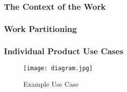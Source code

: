 \documentclass[12pt, titlepage]{article}
\begin{document}
    		\subsubsection{The Context of the Work}
    		\subsubsection{Work Partitioning}
    		\subsubsection{Individual Product Use Cases}
    		 
            \begin{figure}[H]
                \centering
                \texttt{[image: diagram.jpg]}
                \caption{Example Use Case}
                \label{fig:my_label}
            \end{figure}
           
           

    		
    		
\end{document}
